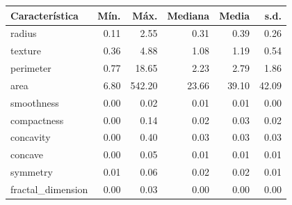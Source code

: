\begin{tabular*}{\textwidth}{@{\extracolsep{\fill}}lrrrrr}
\toprule
Característica & Mín. & Máx. & Mediana & Media & s.d. \\
\midrule
radius & 0.11 & 2.55 & 0.31 & 0.39 & 0.26\\
texture & 0.36 & 4.88 & 1.08 & 1.19 & 0.54\\
perimeter & 0.77 & 18.65 & 2.23 & 2.79 & 1.86\\
area & 6.80 & 542.20 & 23.66 & 39.10 & 42.09\\
smoothness & 0.00 & 0.02 & 0.01 & 0.01 & 0.00\\
\addlinespace
compactness & 0.00 & 0.14 & 0.02 & 0.03 & 0.02\\
concavity & 0.00 & 0.40 & 0.03 & 0.03 & 0.03\\
concave & 0.00 & 0.05 & 0.01 & 0.01 & 0.01\\
symmetry & 0.01 & 0.06 & 0.02 & 0.02 & 0.01\\
fractal\_dimension & 0.00 & 0.03 & 0.00 & 0.00 & 0.00\\
\bottomrule
\end{tabular*}
